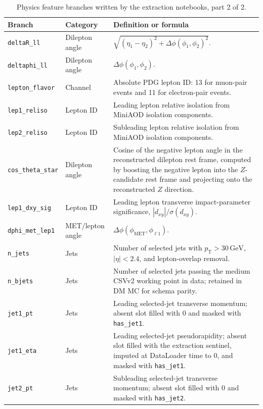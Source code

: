 \documentclass[11pt,a4paper,twocolumn]{article}
\newcommand{\GeV}{\text{GeV}}
\begin{document}
\begin{table}[t]
\centering
\scriptsize
\caption{Physics feature branches written by the extraction notebooks, part 2 of 2.}
\label{tab:appendix-features-cont}
\begin{tabular}{L{0.18\textwidth}L{0.16\textwidth}L{0.58\textwidth}}
\toprule
Branch & Category & Definition or formula \\
\midrule
\texttt{deltaR\_ll} & Dilepton angle & \(\sqrt{(\eta_1-\eta_2)^2+\Delta\phi(\phi_1,\phi_2)^2}\). \\
\texttt{deltaphi\_ll} & Dilepton angle & \(\Delta\phi(\phi_1,\phi_2)\). \\
\texttt{lepton\_flavor} & Channel & Absolute PDG lepton ID: 13 for muon-pair events and 11 for electron-pair events. \\
\texttt{lep1\_reliso} & Lepton ID & Leading lepton relative isolation from MiniAOD isolation components. \\
\texttt{lep2\_reliso} & Lepton ID & Subleading lepton relative isolation from MiniAOD isolation components. \\
\texttt{cos\_theta\_star} & Dilepton angle & Cosine of the negative lepton angle in the reconstructed dilepton rest frame, computed by boosting the negative lepton into the \(Z\)-candidate rest frame and projecting onto the reconstructed \(Z\) direction. \\
\texttt{lep1\_dxy\_sig} & Lepton ID & Leading lepton transverse impact-parameter significance, \(|d_{xy}|/\sigma(d_{xy})\). \\
\texttt{dphi\_met\_lep1} & MET/lepton angle & \(\Delta\phi(\phi_{\mathrm{MET}},\phi_{\ell1})\). \\
\texttt{n\_jets} & Jets & Number of selected jets with \(p_{\mathrm{T}}>30\,\GeV\), \(|\eta|<2.4\), and lepton-overlap removal. \\
\texttt{n\_bjets} & Jets & Number of selected jets passing the medium CSVv2 working point in data; retained in DM MC for schema parity. \\
\texttt{jet1\_pt} & Jets & Leading selected-jet transverse momentum; absent slot filled with \(0\) and masked with \texttt{has\_jet1}. \\
\texttt{jet1\_eta} & Jets & Leading selected-jet pseudorapidity; absent slot filled with the extraction sentinel, imputed at DataLoader time to \(0\), and masked with \texttt{has\_jet1}. \\
\texttt{jet2\_pt} & Jets & Subleading selected-jet transverse momentum; absent slot filled with \(0\) and masked with \texttt{has\_jet2}. \\

\end{tabular}
\end{table}
\end{document}
